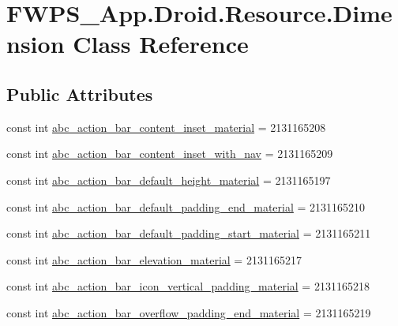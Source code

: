 \hypertarget{class_f_w_p_s___app_1_1_droid_1_1_resource_1_1_dimension}{}\section{F\+W\+P\+S\+\_\+\+App.\+Droid.\+Resource.\+Dimension Class Reference}
\label{class_f_w_p_s___app_1_1_droid_1_1_resource_1_1_dimension}
\subsection*{Public Attributes}
\begin{DoxyCompactItemize}
\item 
const int \mbox{\hyperlink{class_f_w_p_s___app_1_1_droid_1_1_resource_1_1_dimension_a10813b89ea170384e34b49725c81736f}{abc\+\_\+action\+\_\+bar\+\_\+content\+\_\+inset\+\_\+material}} = 2131165208
\item 
const int \mbox{\hyperlink{class_f_w_p_s___app_1_1_droid_1_1_resource_1_1_dimension_aec322808d79918d47aacd83635c0ca4e}{abc\+\_\+action\+\_\+bar\+\_\+content\+\_\+inset\+\_\+with\+\_\+nav}} = 2131165209
\item 
const int \mbox{\hyperlink{class_f_w_p_s___app_1_1_droid_1_1_resource_1_1_dimension_aca3e950efb680d2a1813d541d350c043}{abc\+\_\+action\+\_\+bar\+\_\+default\+\_\+height\+\_\+material}} = 2131165197
\item 
const int \mbox{\hyperlink{class_f_w_p_s___app_1_1_droid_1_1_resource_1_1_dimension_a3612072e80b65ce2569f8c859755284a}{abc\+\_\+action\+\_\+bar\+\_\+default\+\_\+padding\+\_\+end\+\_\+material}} = 2131165210
\item 
const int \mbox{\hyperlink{class_f_w_p_s___app_1_1_droid_1_1_resource_1_1_dimension_aa78d81072b48be9bf5047c64cde2e169}{abc\+\_\+action\+\_\+bar\+\_\+default\+\_\+padding\+\_\+start\+\_\+material}} = 2131165211
\item 
const int \mbox{\hyperlink{class_f_w_p_s___app_1_1_droid_1_1_resource_1_1_dimension_a5730badc7c7fb8f89c47f7d2cd1aab54}{abc\+\_\+action\+\_\+bar\+\_\+elevation\+\_\+material}} = 2131165217
\item 
const int \mbox{\hyperlink{class_f_w_p_s___app_1_1_droid_1_1_resource_1_1_dimension_a82b186a43c4b4c9683b9b41b46272306}{abc\+\_\+action\+\_\+bar\+\_\+icon\+\_\+vertical\+\_\+padding\+\_\+material}} = 2131165218
\item 
const int \mbox{\hyperlink{class_f_w_p_s___app_1_1_droid_1_1_resource_1_1_dimension_a9f5b163a7f3d94a4afdaedb162503fe9}{abc\+\_\+action\+\_\+bar\+\_\+overflow\+\_\+padding\+\_\+end\+\_\+material}} = 2131165219

\end{DoxyCompactItemize}
